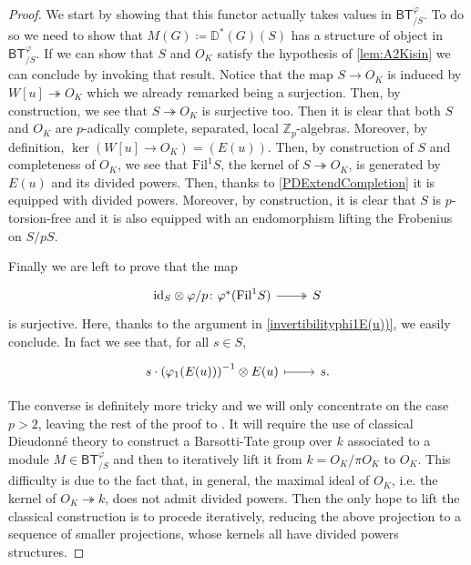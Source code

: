 \begin{proof}\leavevmode\vspace{-.2\baselineskip}
We start by showing that this functor actually takes values in $\mathsf{BT}^{\varphi}_{/S}$.
To do so we need to show that $M(G) \coloneqq \mathbb{D}^{*}(G)(S)$
has a structure of object in $\mathsf{BT}^{\varphi}_{/S}$.
If we can show that $S$ and $O_K$ satisfy the hypothesis of \cref{lem:A2Kisin}
we can conclude by invoking that result.
Notice that the map $S \to O_K$ is induced by $W[u] \twoheadrightarrow O_K$
which we already remarked being a surjection.
Then, by construction, we see that $S \twoheadrightarrow O_K$
is surjective too.
Then it is clear that both $S$ and $O_K$ are 
$p$-adically complete, separated, local $\mathbb{Z}_{p}$-algebras.
Moreover, by definition, $\ker (W[u] \to O_K) = (E(u))$.
Then, by construction of $S$ and completeness of $O_K$,
we see that $\mathrm{Fil}^1 S$, the kernel of $S \twoheadrightarrow O_K$, is generated
by $E(u)$ and its divided powers.
Then, thanks to \cref{PDExtendCompletion} it is equipped with divided powers.
Moreover, by construction, it is clear that $S$ is $p$-torsion-free
and it is also equipped with an endomorphism lifting the Frobenius on $S/pS$.

Finally we are left to prove that the map
\begin{equation*}
\begin{tikzcd}[row sep = 0ex
	,/tikz/column 1/.append style={anchor=base east}
	,/tikz/column 2/.append style={anchor=base west}]
	\mathrm{id}_{ S } \otimes \varphi/p \colon 
	\varphi^*(\mathrm{Fil}^1 S) \arrow[r, "", twoheadrightarrow] &
	S
\end{tikzcd}
\end{equation*} 
is surjective.
Here, thanks to the argument in \cref{invertibilityphi1E(u))}, we easily conclude.
In fact we see that, for all $s \in S$,
\begin{equation*}
\begin{tikzcd}[row sep = 0ex
	,/tikz/column 1/.append style={anchor=base east}
	,/tikz/column 2/.append style={anchor=base west}]
	s \cdot \left( \varphi_1(E(u)) \right)^{-1} \otimes E(u) 
	\arrow[r, "", mapsto] & 
	s
.\end{tikzcd}
\end{equation*} 


The converse is definitely more tricky and we will only concentrate on
the case $p > 2$, leaving the rest of the proof to \cite{Kisin}.
It will require the use of classical Dieudonné theory to construct a
Barsotti-Tate group over $k$ associated to a module $M \in \mathsf{BT}^{\varphi}_{/S}$
and then to iteratively lift it from $k = O_K/\pi O_K$ to $O_K$.
This difficulty is due to the fact that, in general, the maximal
ideal of $O_K$, i.e. the kernel of $O_K \twoheadrightarrow k$, 
does not admit divided powers.
Then the only hope to lift the classical construction is to
procede iteratively, reducing the above projection to a sequence of
smaller projections, whose kernels all have divided powers structures.


\end{proof}
